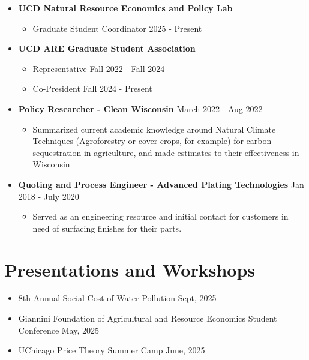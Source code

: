 \documentclass{article}[12]
\begin{document}
\begin{itemize}[itemsep=0.75em]
    \item \textbf{UCD Natural Resource Economics and Policy Lab}
        \begin{itemize}
            \item Graduate Student Coordinator \hfill 2025 - Present
        \end{itemize}
    
    \item \textbf{UCD ARE Graduate Student Association}
    \begin{itemize}
        \item Representative \hfill Fall 2022 - Fall 2024
        \item Co-President \hfill Fall 2024 - Present
    \end{itemize}

   \item \textbf{Policy Researcher - Clean Wisconsin} \hfill March 2022 - Aug 2022
    \begin{itemize}
        \item  Summarized current academic knowledge around Natural Climate Techniques (Agroforestry or cover crops, for example) for carbon sequestration in agriculture, and made estimates to their effectiveness in Wisconsin
    \end{itemize}
    
    \item \textbf{Quoting and Process Engineer - Advanced Plating Technologies} \hfill Jan 2018 - July 2020
    \begin{itemize}
        \item Served as an engineering resource and initial contact for customers in need of surfacing finishes for their parts.  
    \end{itemize}

\end{itemize}

\section{Presentations and Workshops}
\begin{itemize}
    \item 8th Annual Social Cost of Water Pollution \hfill Sept, 2025
    \item Giannini Foundation of Agricultural and Resource Economics Student Conference \hfill May, 2025
    \item UChicago Price Theory Summer Camp \hfill June, 2025
\end{itemize}
\end{document}
